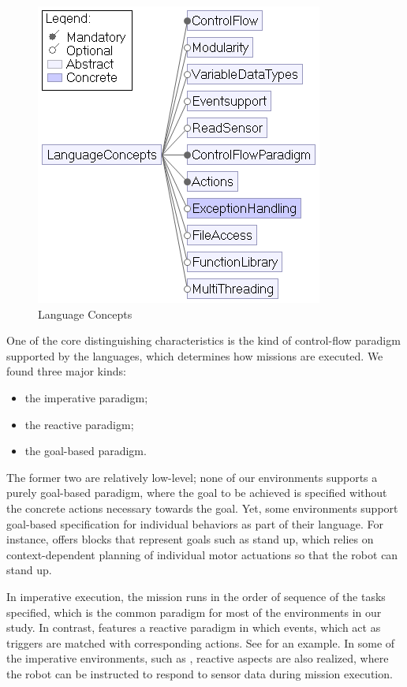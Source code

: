 \begin{figure}[t]
     \centering
    \includegraphics[width=.6\columnwidth]{LanguageConcepts.png}
      \caption{Language Concepts%
      }
      \label{fig:langconcepts}
			\vspace{-.4cm}
   \end{figure}

 One of the core distinguishing characteristics is the kind of control-flow paradigm supported by the languages, which determines how missions are executed. We found three major kinds: 
\begin{itemize}
	\item the imperative paradigm;
	\item the reactive paradigm;
	\item the goal-based paradigm.
\end{itemize}

The former two are relatively low-level; none of our environments supports a purely goal-based paradigm, where the goal to be achieved is specified without the concrete actions necessary towards the goal. Yet, some environments support goal-based specification for individual behaviors as part of their language. For instance, \choregraphe offers blocks that represent goals such as stand up, which relies on context-dependent planning of individual motor actuations so that the robot can stand up.

In imperative execution, the mission runs in the order of sequence of the tasks specified, which is the common paradigm for most of the environments in our study. In contrast, \aseba features a reactive paradigm in which events, which act as triggers are matched with corresponding actions. See  for an example. In some of the imperative environments, such as \picaxe, reactive aspects are also realized, where the robot can be instructed to respond to sensor data during mission execution.

